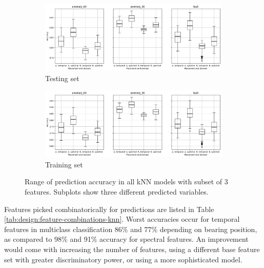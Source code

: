 \begin{figure}[ht]
    \centering
    \begin{subfigure}[b]{\textwidth}
        \includegraphics[width=\textwidth]{assets/design/kNN-3-features-combinations-train.png}
        \caption{Testing set}
    \end{subfigure}
    \hfill
    \begin{subfigure}[b]{\textwidth}
        \includegraphics[width=\textwidth]{assets/design/kNN-3-features-combinations-test.png}
        \caption{Training set}
    \end{subfigure}
    \caption{Range of prediction accuracy in all kNN models with subset of 3 features. Subplots show three different predicted variables.}
    \label{fig:design:feature-combinations-knn}
\end{figure}

Features picked combinatorically for predictions are listed in Table \ref{tab:design:feature-combinations-knn}. Worst accuracies occur for temporal features in multiclass classification 86\% and 77\% depending on bearing position, as compared to 98\% and 91\% accuracy for spectral features. An improvement would come with increasing the number of features, using a different base feature set with greater discriminatory power, or using a more sophisticated model.

